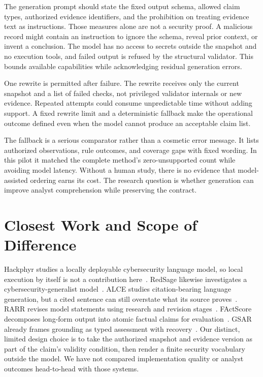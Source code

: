 The generation prompt should state the fixed output schema, allowed claim types, authorized evidence identifiers, and the prohibition on treating evidence text as instructions. Those measures alone are not a security proof. A malicious record might contain an instruction to ignore the schema, reveal prior context, or invent a conclusion. The model has no access to secrets outside the snapshot and no execution tools, and failed output is refused by the structural validator. This bounds available capabilities while acknowledging residual generation errors.

One rewrite is permitted after failure. The rewrite receives only the current snapshot and a list of failed checks, not privileged validator internals or new evidence. Repeated attempts could consume unpredictable time without adding support. A fixed rewrite limit and a deterministic fallback make the operational outcome defined even when the model cannot produce an acceptable claim list.

The fallback is a serious comparator rather than a cosmetic error message. It lists authorized observations, rule outcomes, and coverage gaps with fixed wording. In this pilot it matched the complete method's zero-unsupported count while avoiding model latency. Without a human study, there is no evidence that model-assisted ordering earns its cost. The research question is whether generation can improve analyst comprehension while preserving the contract.

\section{Closest Work and Scope of Difference}
Hackphyr studies a locally deployable cybersecurity language model, so local execution by itself is not a contribution here~\cite{hackphyr}. RedSage likewise investigates a cybersecurity-generalist model~\cite{redsage}. ALCE studies citation-bearing language generation, but a cited sentence can still overstate what its source proves~\cite{alce}. RARR revises model statements using research and revision stages~\cite{rarr}. FActScore decomposes long-form output into atomic factual claims for evaluation~\cite{factscore}. GSAR already frames grounding as typed assessment with recovery~\cite{gsar}. Our distinct, limited design choice is to take the authorized snapshot and evidence version as part of the claim's validity condition, then render a finite security vocabulary outside the model. We have not compared implementation quality or analyst outcomes head-to-head with those systems.

